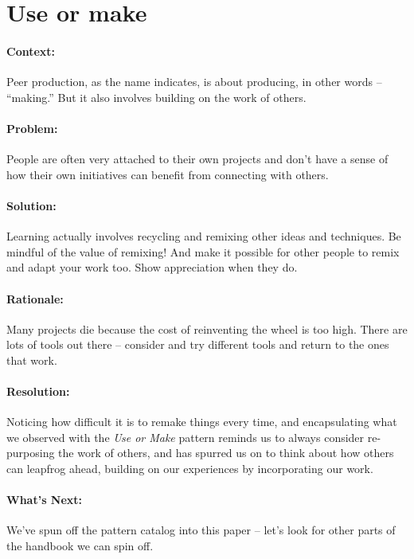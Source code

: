 \section{Use or make}
\paragraph{Context:}
Peer production, as the name indicates, is about producing, in other words --
``making.'' But it also involves building on the work of others.

\paragraph{Problem:}
People are often very attached to their own projects and don't have a sense of how their own initiatives can benefit from connecting with others.

\paragraph{Solution:} Learning actually involves recycling and remixing other ideas and techniques. Be mindful of the value of remixing!  And make it possible for other people to remix and adapt your work too.  Show appreciation when they do.

\paragraph{Rationale:} 
Many projects die because the cost of reinventing the wheel is too high.  There are lots of tools out there -- consider and try different tools and return to the ones that work.

\paragraph{Resolution:} Noticing how difficult it is to remake things every time, and encapsulating what we observed with the \emph{Use or Make} pattern reminds us to always consider re-purposing the work of others, and has spurred us on to think about how others can leapfrog ahead, building on our experiences by incorporating our work.

\paragraph{What's Next:} We've spun off the pattern catalog into this paper -- let's look for other parts of the handbook we can spin off.
